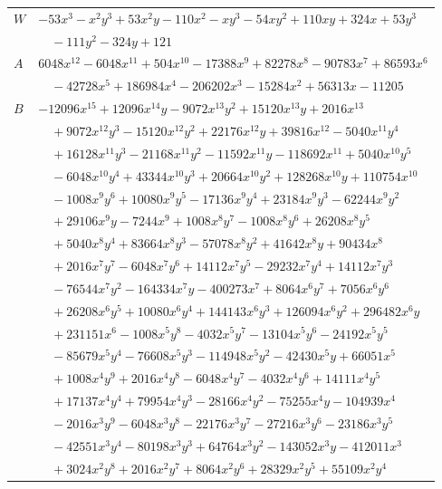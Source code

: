 \documentclass[11pt]{article}
\begin{document}
\begin{longtable}{@{}ll@{}}
$W$ & $-53x^{3}-x^{2}y^{3}+53x^{2}y-110x^{2}-xy^{3}-54xy^{2}+110xy+324x+53y^{3}$\\
 & $\quad -111y^{2}-324y+121$\\
$A$ & $6048x^{12}-6048x^{11}+504x^{10}-17388x^{9}+82278x^{8}-90783x^{7}+86593x^{6}$\\
 & $\quad -42728x^{5}+186984x^{4}-206202x^{3}-15284x^{2}+56313x-11205$\\
$B$ & $-12096x^{15}+12096x^{14}y-9072x^{13}y^{2}+15120x^{13}y+2016x^{13}$\\
 & $\quad +9072x^{12}y^{3}-15120x^{12}y^{2}+22176x^{12}y+39816x^{12}-5040x^{11}y^{4}$\\
 & $\quad +16128x^{11}y^{3}-21168x^{11}y^{2}-11592x^{11}y-118692x^{11}+5040x^{10}y^{5}$\\
 & $\quad -6048x^{10}y^{4}+43344x^{10}y^{3}+20664x^{10}y^{2}+128268x^{10}y+110754x^{10}$\\
 & $\quad -1008x^{9}y^{6}+10080x^{9}y^{5}-17136x^{9}y^{4}+23184x^{9}y^{3}-62244x^{9}y^{2}$\\
 & $\quad +29106x^{9}y-7244x^{9}+1008x^{8}y^{7}-1008x^{8}y^{6}+26208x^{8}y^{5}$\\
 & $\quad +5040x^{8}y^{4}+83664x^{8}y^{3}-57078x^{8}y^{2}+41642x^{8}y+90434x^{8}$\\
 & $\quad +2016x^{7}y^{7}-6048x^{7}y^{6}+14112x^{7}y^{5}-29232x^{7}y^{4}+14112x^{7}y^{3}$\\
 & $\quad -76544x^{7}y^{2}-164334x^{7}y-400273x^{7}+8064x^{6}y^{7}+7056x^{6}y^{6}$\\
 & $\quad +26208x^{6}y^{5}+10080x^{6}y^{4}+144143x^{6}y^{3}+126094x^{6}y^{2}+296482x^{6}y$\\
 & $\quad +231151x^{6}-1008x^{5}y^{8}-4032x^{5}y^{7}-13104x^{5}y^{6}-24192x^{5}y^{5}$\\
 & $\quad -85679x^{5}y^{4}-76608x^{5}y^{3}-114948x^{5}y^{2}-42430x^{5}y+66051x^{5}$\\
 & $\quad +1008x^{4}y^{9}+2016x^{4}y^{8}-6048x^{4}y^{7}-4032x^{4}y^{6}+14111x^{4}y^{5}$\\
 & $\quad +17137x^{4}y^{4}+79954x^{4}y^{3}-28166x^{4}y^{2}-75255x^{4}y-104939x^{4}$\\
 & $\quad -2016x^{3}y^{9}-6048x^{3}y^{8}-22176x^{3}y^{7}-27216x^{3}y^{6}-23186x^{3}y^{5}$\\
 & $\quad -42551x^{3}y^{4}-80198x^{3}y^{3}+64764x^{3}y^{2}-143052x^{3}y-412011x^{3}$\\
 & $\quad +3024x^{2}y^{8}+2016x^{2}y^{7}+8064x^{2}y^{6}+28329x^{2}y^{5}+55109x^{2}y^{4}$\\

\end{longtable}
\end{document}
